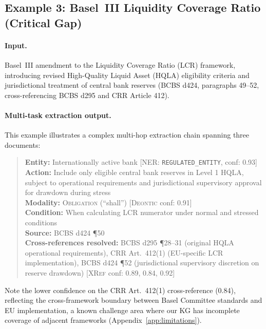 \documentclass[11pt]{article}
\begin{document}
\subsection{Example 3: Basel~III Liquidity Coverage Ratio (Critical Gap)}

\paragraph{Input.}  Basel~III amendment to the Liquidity Coverage Ratio (LCR) framework, introducing revised High-Quality Liquid Asset (HQLA) eligibility criteria and jurisdictional treatment of central bank reserves (BCBS d424, paragraphs 49--52, cross-referencing BCBS d295 and CRR Article 412).

\paragraph{Multi-task extraction output.}  This example illustrates a complex multi-hop extraction chain spanning three documents:
\begin{quote}
	\small
	\textbf{Entity:} Internationally active bank \hfill [\textsc{NER}: \texttt{REGULATED\_ENTITY}, conf: 0.93] \\
	\textbf{Action:} Include only eligible central bank reserves in Level 1 HQLA, subject to operational requirements and jurisdictional supervisory approval for drawdown during stress \\
	\textbf{Modality:} \textsc{Obligation} (``shall'') \hfill [\textsc{Deontic} conf: 0.91] \\
	\textbf{Condition:} When calculating LCR numerator under normal and stressed conditions \\
	\textbf{Source:} BCBS d424 \P50 \\
	\textbf{Cross-references resolved:} BCBS d295 \P28--31 (original HQLA operational requirements), CRR Art.~412(1) (EU-specific LCR implementation), BCBS d424 \P52 (jurisdictional supervisory discretion on reserve drawdown) \hfill [\textsc{XRef} conf: 0.89, 0.84, 0.92]
\end{quote}

Note the lower confidence on the CRR Art.~412(1) cross-reference (0.84), reflecting the cross-framework boundary between Basel Committee standards and EU implementation, a known challenge area where our KG has incomplete coverage of adjacent frameworks (Appendix~\ref{app:limitations}).
\end{document}
